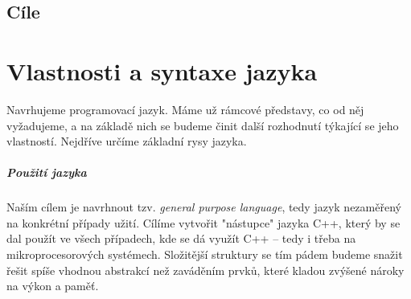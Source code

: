 \begin{comment}
Mou hlavní motivací je nespokojenost se stávajícími programovacími jazyky. Programování mám jako koníčka už od nějakých dvanácti let, a tak jsem ještě před nastoupením na FIT získal nějaké zkušenosti z psaní aplikací v Object Pascalu (Delphi), C++ (Qt, SDL + OpenGL) a PHP (webové aplikace). FIT pak můj repertoár (i když jen rámcově) rozšířil na valnou většinu dnes používaných jazyků. Bohužel jsem ale nenarazil na žádný, který by splňoval mé požadavky. Rozhodl jsem se tedy využít nutnost napsání bakalářské práce k~uskutečnění mého dlouholetého snu.

\paragraph{Jazyk D}
Mému srdci nejbližší jazyk, na který jsem ve svém pátrání narazil, byl jazyk D. Jedná se o kompilovaný jazyk vycházející z C++ (binárky jsou do jisté míry kompatibilní) s~velice podobnou syntaxí. Největší rozdíly jsou modulový systém\footnote{\url{http://dlang.org/spec/module.html}} (zdrojový kód je rozdělen do modulů, které se vzájemně, i rekurzivně, importují; odpadá nutnost psát hlavičkové soubory), značně rozšířená funkčnost metaprogramování s šablonami a~rozšířená schopnost vykonávat funkce za doby kompilace.

D mi byl velikou inspirací při navrhování mého jazyka. Bohužel i v D jsem narazil na strop možnosti (ačkoli byl značně výš než třeba v C++), kdy některé věci nešly napsat tak jednoduše, jak bych chtěl. Tento jazyk však dokazuje, že tato bariéra může být mnohem dál. Já ji chci ve svém jazyku ještě více posunout. 
\end{comment}


\section{Cíle}

\chapter{Vlastnosti a syntaxe jazyka}
Navrhujeme programovací jazyk. Máme už rámcové představy, co od něj vyžadujeme, a na základě nich se budeme činit další rozhodnutí týkající se jeho vlastností. Nejdříve určíme základní rysy jazyka.

\paragraph{Použití jazyka}
Naším cílem je navrhnout tzv. \textit{general purpose language}, tedy jazyk nezaměřený na konkrétní případy užití. Cílíme vytvořit "nástupce" jazyka C++, který by se dal použít ve všech případech, kde se dá využít C++ -- tedy i třeba na mikroprocesorových systémech. Složitější struktury se tím pádem budeme snažit řešit spíše vhodnou abstrakcí než zaváděním prvků, které kladou zvýšené nároky na výkon a paměť.

